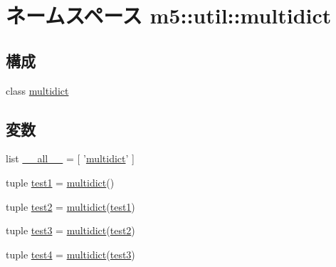 \hypertarget{namespacem5_1_1util_1_1multidict}{
\section{ネームスペース m5::util::multidict}
\label{namespacem5_1_1util_1_1multidict}
}
\subsection*{構成}
\begin{DoxyCompactItemize}
\item 
class \hyperlink{classm5_1_1util_1_1multidict_1_1multidict}{multidict}
\end{DoxyCompactItemize}
\subsection*{変数}
\begin{DoxyCompactItemize}
\item 
list \hyperlink{namespacem5_1_1util_1_1multidict_aa4a022e6ddacd362b83964da5cc5d044}{\_\-\_\-all\_\-\_\-} = \mbox{[} '\hyperlink{classm5_1_1util_1_1multidict_1_1multidict}{multidict}' \mbox{]}
\item 
tuple \hyperlink{namespacem5_1_1util_1_1multidict_ab93db430d74f5d529799f9dae465e7d3}{test1} = \hyperlink{classm5_1_1util_1_1multidict_1_1multidict}{multidict}()
\item 
tuple \hyperlink{namespacem5_1_1util_1_1multidict_a85ad095b05ea3563950747d52c96b183}{test2} = \hyperlink{classm5_1_1util_1_1multidict_1_1multidict}{multidict}(\hyperlink{namespacem5_1_1util_1_1multidict_ab93db430d74f5d529799f9dae465e7d3}{test1})
\item 
tuple \hyperlink{namespacem5_1_1util_1_1multidict_a25b18d0bd2a18cc98abeb390dec23df6}{test3} = \hyperlink{classm5_1_1util_1_1multidict_1_1multidict}{multidict}(\hyperlink{namespacem5_1_1util_1_1multidict_a85ad095b05ea3563950747d52c96b183}{test2})
\item 
tuple \hyperlink{namespacem5_1_1util_1_1multidict_a26dd386e85a8995765309eecdb60475f}{test4} = \hyperlink{classm5_1_1util_1_1multidict_1_1multidict}{multidict}(\hyperlink{namespacem5_1_1util_1_1multidict_a25b18d0bd2a18cc98abeb390dec23df6}{test3})
\end{DoxyCompactItemize}


